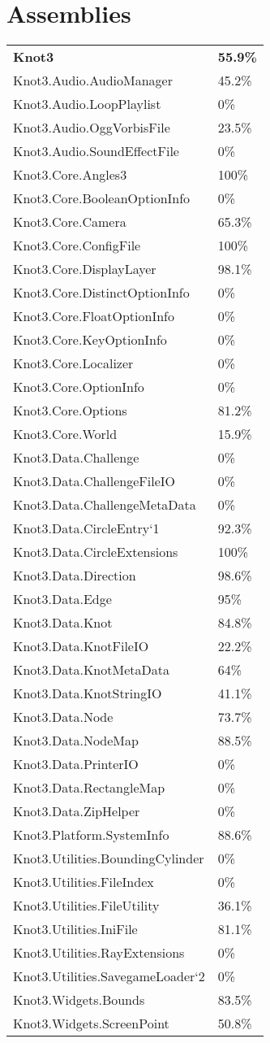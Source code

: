 \documentclass[a4paper,10pt]{article}
\begin{document}
\section{Assemblies}
\begin{longtable}[l]{ll}
\textbf{Knot3} & \textbf{55.9\%}\\
Knot3.Audio.AudioManager & 45.2\%\\
Knot3.Audio.LoopPlaylist & 0\%\\
Knot3.Audio.OggVorbisFile & 23.5\%\\
Knot3.Audio.SoundEffectFile & 0\%\\
Knot3.Core.Angles3 & 100\%\\
Knot3.Core.BooleanOptionInfo & 0\%\\
Knot3.Core.Camera & 65.3\%\\
Knot3.Core.ConfigFile & 100\%\\
Knot3.Core.DisplayLayer & 98.1\%\\
Knot3.Core.DistinctOptionInfo & 0\%\\
Knot3.Core.FloatOptionInfo & 0\%\\
Knot3.Core.KeyOptionInfo & 0\%\\
Knot3.Core.Localizer & 0\%\\
Knot3.Core.OptionInfo & 0\%\\
Knot3.Core.Options & 81.2\%\\
Knot3.Core.World & 15.9\%\\
Knot3.Data.Challenge & 0\%\\
Knot3.Data.ChallengeFileIO & 0\%\\
Knot3.Data.ChallengeMetaData & 0\%\\
Knot3.Data.CircleEntry`1 & 92.3\%\\
Knot3.Data.CircleExtensions & 100\%\\
Knot3.Data.Direction & 98.6\%\\
Knot3.Data.Edge & 95\%\\
Knot3.Data.Knot & 84.8\%\\
Knot3.Data.KnotFileIO & 22.2\%\\
Knot3.Data.KnotMetaData & 64\%\\
Knot3.Data.KnotStringIO & 41.1\%\\
Knot3.Data.Node & 73.7\%\\
Knot3.Data.NodeMap & 88.5\%\\
Knot3.Data.PrinterIO & 0\%\\
Knot3.Data.RectangleMap & 0\%\\
Knot3.Data.ZipHelper & 0\%\\
Knot3.Platform.SystemInfo & 88.6\%\\
Knot3.Utilities.BoundingCylinder & 0\%\\
Knot3.Utilities.FileIndex & 0\%\\
Knot3.Utilities.FileUtility & 36.1\%\\
Knot3.Utilities.IniFile & 81.1\%\\
Knot3.Utilities.RayExtensions & 0\%\\
Knot3.Utilities.SavegameLoader`2 & 0\%\\
Knot3.Widgets.Bounds & 83.5\%\\
Knot3.Widgets.ScreenPoint & 50.8\%\\
\end{longtable}
\end{document}

